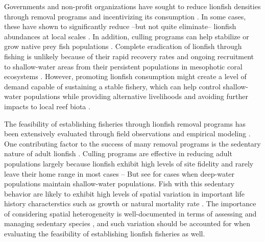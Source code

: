 \documentclass[fleqn,10pt,lineno]{wlpeerj} %
\begin{document}
Governments and non-profit organizations have sought to reduce lionfish
densities through removal programs and incentivizing its consumption
\citep{chin_2016}. In some cases, these have shown to significantly
reduce --but not quite eliminate-- lionfish abundances at local scales
\citep{sandel_2015,chin_2016,deleon_2013}. In addition, culling programs
can help stabilize or grow native prey fish populations
\citep{cote_2014}. Complete eradication of lionfish through fishing is
unlikely because of their rapid recovery rates and ongoing recruitment
to shallow-water areas from their persistent populations in mesophotic
coral ecosystems \citep{barbour_2011,andradibrown_2017}. However,
promoting lionfish consumption might create a level of demand capable of
sustaining a stable fishery, which can help control shallow-water
populations while providing alternative livelihoods and avoiding further
impacts to local reef biota \citep{chin_2016}.

The feasibility of establishing fisheries through lionfish removal
programs has been extensively evaluated through field observations and
empirical modeling
\citep{barbour_2011,morris_2011,deleon_2013,johnston_2015,sandel_2015,chin_2016,usseglio_2017}.
One contributing factor to the success of many removal programs is the
sedentary nature of adult lionfish \citep{jud_2012}. Culling programs
are effective in reducing adult populations largely because lionfish
exhibit high levels of site fidelity and rarely leave their home range
in most cases \citep{Fishelson_1997,cote_2014,kochzius_2005} -- But see
\citet{andradibrown_2017} for cases when deep-water populations maintain
shallow-water populations. Fish with this sedentary behavior are likely
to exhibit high levels of spatial variation in important life history
characterstics such as growth or natural mortality rate
\citep{hutchinson_2008,wilson_2012}. The importance of considering
spatial heterogeneity is well-documented in terms of assessing and
managing sedentary species \citep{gunderson_2008,guan_2013}, and such
variation should be accounted for when evaluating the feasibility of
establishing lionfish fisheries as well.
\end{document}
